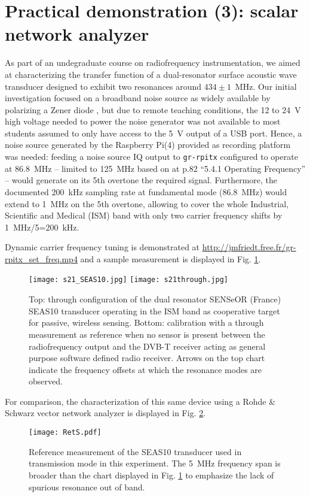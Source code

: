 \documentclass{article}
\begin{document}
\section{Practical demonstration (3): scalar network analyzer}

As part of an undegraduate course on radiofrequency instrumentation,
we aimed at characterizing the transfer function of a dual-resonator
surface acoustic wave transducer designed to exhibit two resonances
around $434\pm 1$~MHz. Our initial investigation focused on a broadband
noise source as widely available by polarizing a Zener diode \cite{zener1,zener2},
but due to remote teaching conditions, the 12 to 24~V high voltage needed to 
power the noise generator was not available to most students assumed
to only have access to the 5~V output of a USB port. Hence, a noise source
generated by the Raspberry Pi(4) provided as recording platform was needed:
feeding a noise source IQ output to {\tt gr-rpitx} configured to operate
at 86.8~MHz -- limited to 125~MHz based on
\cite{ds} at p.82 ``5.4.1 Operating Frequency'' -- would generate on its 5th 
overtone the required signal. Furthermore,
the documented 200~kHz sampling rate at fundamental mode (86.8~MHz) would extend
to 1~MHz on the 5th overtone, allowing to cover the whole Industrial, Scientific
and Medical (ISM) band with only two carrier frequency shifts by 1~MHz/5=200~kHz.

Dynamic carrier frequency tuning is demonstrated at
\url{http://jmfriedt.free.fr/gr-rpitx_set_freq.mp4} and a sample measurement is
displayed in Fig. \ref{s21}.

\begin{figure}[h!tb]
\texttt{[image: s21\_SEAS10.jpg]}
\texttt{[image: s21through.jpg]}
\caption{Top: through configuration of the dual resonator SENSeOR (France) SEAS10 transducer
operating in the ISM band as cooperative target for passive, wireless sensing. Bottom: calibration
with a through measurement as reference when no sensor is present between the radiofrequency
output and the DVB-T receiver acting as general purpose software defined radio receiver. Arrows
on the top chart indicate the frequency offsets at which the resonance modes are observed.}
\label{s21}
\end{figure}

For comparison, the characterization of this same device using a Rohde \& Schwarz 
vector network analyzer is displayed in Fig. \ref{rs}.

\begin{figure}[h!tb]
\texttt{[image: RetS.pdf]}
\caption{Reference measurement of the SEAS10 transducer used in transmission mode in this 
experiment. The 5~MHz frequency span is broader than the chart displayed in Fig. \ref{s21}
to emphasize the lack of spurious resonance out of band.}
\label{rs}
\end{figure}
\end{document}

